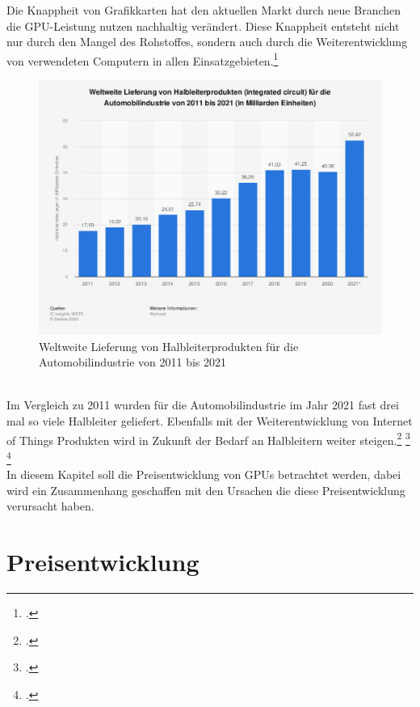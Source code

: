 \documentclass[12pt,toc=bib,toc=listof]{scrreprt}
\begin{document}
Die Knappheit von Grafikkarten hat den
aktuellen Markt durch neue Branchen die GPU-Leistung nutzen nachhaltig verändert.
Diese Knappheit entsteht nicht nur durch den Mangel des Rohstoffes, sondern auch durch die 
Weiterentwicklung von verwendeten Computern in allen Einsatzgebieten.\footcite [Vgl.] []{Voas.2021}
\\
\begin{figure}[h]
  \centering
  \includegraphics[scale=0.35]{Abbildungen/Martin_Kords_1.png} %
  \caption[M. Kords (2022)] {Weltweite Lieferung von Halbleiterprodukten für die Automobilindustrie von 2011 bis 2021}
\end{figure}
\\
Im Vergleich zu 2011 wurden für die Automobilindustrie im Jahr 2021 fast drei mal so viele
Halbleiter geliefert. Ebenfalls mit der Weiterentwicklung von Internet of Things Produkten wird in
Zukunft der Bedarf an Halbleitern weiter steigen.\footcite [Vgl.] []{Bill_McClean} \footcite [Vgl.] []{Voas.2021} \footcite [Vgl.] {Kords.2022}
\\In diesem Kapitel soll die Preisentwicklung von GPUs betrachtet werden, dabei wird 
ein Zusammenhang geschaffen mit den Ursachen die diese Preisentwicklung 
verursacht haben.
\\

\section{Preisentwicklung}
\label{sec:Preisentwicklung}
\end{document}
